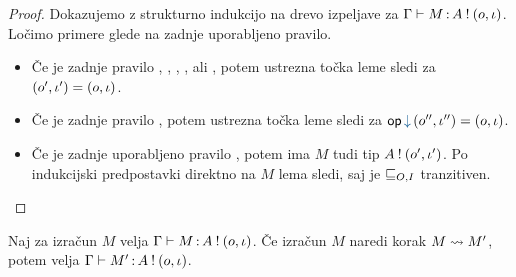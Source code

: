 \begin{proof}
	Dokazujemo z strukturno indukcijo na drevo izpeljave za $\Gamma \vdash M \mathinner{:} A \mathbin{!} (o, \iota)$.
	Ločimo primere glede na zadnje uporabljeno pravilo.
	
	\begin{itemize}
		\item Če je zadnje pravilo , , , ,  ali , potem ustrezna točka leme sledi za $(o', \iota') = (o, \iota)$.
		
		\item Če je zadnje pravilo , potem ustrezna točka leme sledi za $\opincomp{op}{(\o'', \i'')} = (\o, \i)$.
		
		\item Če je zadnje uporabljeno pravilo , potem ima $M$ tudi tip $A \mathbin{!} (o', \iota')$. Po indukcijski predpostavki direktno na $M$ lema sledi, saj je $\sqsubseteq_{O, I}$ tranzitiven.
	\end{itemize}
\end{proof}

\begin{trditev}[o ohranitvi]\label{trd:ohranitev-izracuni}
	Naj za izračun $M$ velja $\Gamma \vdash M \mathinner{:} A \mathbin{!} (o, \iota)$. Če izračun $M$ naredi korak $M \leadsto M'$, potem velja $\Gamma \vdash M' \mathinner{:} A \mathbin{!} (o, \iota)$.
\end{trditev}

